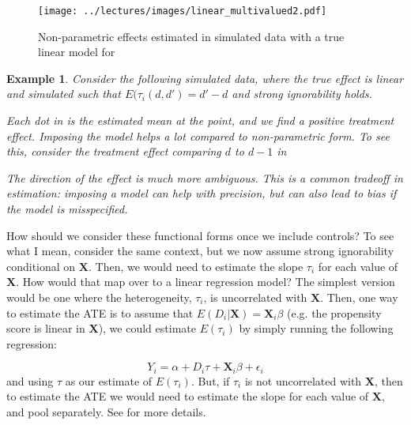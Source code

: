\documentclass{tufte-handout}
\theoremstyle{break}
\newtheorem{exmp}{Example}
\newcommand{\bX}{\mathbf{X}}
\begin{document}
\begin{figure*}
  \texttt{[image: ../lectures/images/linear\_multivalued2.pdf]}
  \caption{Non-parametric effects estimated in simulated data with a true linear model for }
  \label{fig:linearmodel2}
\end{figure*}
\begin{boxD}
  \begin{exmp}
    \label{exmp:linearmodel}
    Consider the following simulated data, where the true effect is linear and simulated such that $E(\tau_{i}(d, d') = d'-d$ and strong ignorability holds. 

    \hspace{10pt} Each dot in  is the estimated mean at the point, and we find a positive treatment effect. Imposing the model helps \emph{a lot} compared to non-parametric form. To see this, consider the treatment effect comparing $d$ to $d-1$ in 

    \hspace{10pt} The direction of the effect is much more ambiguous. This is a common tradeoff in estimation: imposing a model can help with precision, but can also lead to bias if the model is misspecified.
  \end{exmp}
  \end{boxD}


How should we consider these functional forms once we include controls? To see what I mean, consider the same context, but we now assume strong ignorability conditional on $\bX$. Then, we would need to estimate the slope $\tau_{i}$ for each value of $\bX$. How would that map over to a linear regression model? The simplest version would be one where the heterogeneity, $\tau_{i}$, is uncorrelated with $\bX$. Then, one way to estimate the ATE is to assume that $E(D_{i} | \bX) = \bX_{i}\beta$ (e.g. the propensity score is linear in $\bX$), we could estimate $E(\tau_{i})$ by simply running the following regression:

\begin{equation}
  \label{eq:covariate_linear}
  Y_{i} = \alpha + D_{i}\tau + \bX_{i} \beta + \epsilon_{i}
\end{equation}
and using $\tau$ as our estimate of $E(\tau_{i})$. But, if $\tau_{i}$ is not uncorrelated with $\bX$, then to estimate the ATE we would need to estimate the slope for each value of $\bX$, and pool separately. See  for more details.
\end{document}
